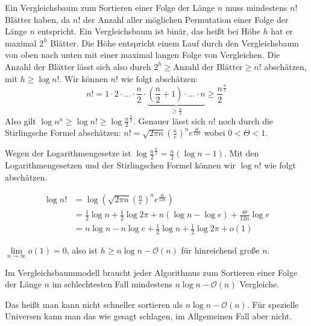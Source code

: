 Ein Vergleichsbaum zum Sortieren einer Folge der Länge $n$ muss mindestens $n!$ Blätter haben, da $n!$ der Anzahl aller möglichen Permutation einer Folge der Länge $n$ entspricht. Ein Vergleichsbaum ist binär, das heißt bei Höhe $h$ hat er maximal $2^h$ Blätter. Die Höhe entspricht einem Lauf durch den Vergleichsbaum von oben nach unten mit einer maximal langen Folge von Vergleichen. Die Anzahl der Blätter lässt sich also durch $2^h \ge \text{Anzahl der Blätter} \ge n!$ abschätzen, mit $h \ge \log n!$.
Wir können $n!$ wie folgt abschätzen:
\[n! = 1 \cdot 2 \cdot \ldots \cdot \frac{n}{2} \cdot \underbrace{\left(\frac{n}{2}+1\right) \cdot \ldots \cdot n}_{\ge \frac{n}{2}} \ge \frac{n}{2}^{\frac{n}{2}}\]
Also gilt $\log n^n \ge \log n! \ge \log \frac{n}{2}^{\frac{n}{2}}$. Genauer lässt sich $n!$ noch durch die Stirlingsche Formel abschätzen: $n! = \sqrt{2 \pi n} \left(\frac{n}{e}\right)^n e^{\frac{\Theta}{12n}}$ wobei $0<\Theta<1$.

Wegen der Logarithmengesetze  ist $\log \frac{n}{2}^{\frac{n}{2}} = \frac{n}{2} (\log n-1)$. Mit den Logarithmengesetzen und der Stirlingschen Formel können wir $\log n!$ wie folgt abschätzen.

\begin{align*}
\log n! &= \log \left(\sqrt{2 \pi n} \left(\frac{n}{e}\right)^n e^{\frac{\Theta}{12n}}\right) \\
          &= \frac{1}{2} \log n + \frac{1}{2} \log 2 \pi + n (\log n - \log e) + \frac{\Theta}{12n} \log e\\
          &= n \log n - n \log e + \frac{1}{2} \log n + \frac{1}{2} \log 2 \pi +  o(1)
\end{align*}

$\lim\limits_{n \rightarrow \infty}{o(1)} = 0$, also ist $h \ge n \log{n} - \mathcal{O}(n)$ für hinreichend große $n$.

\begin{Satz}
\hspace{\parindent}Im Vergleichsbaummodell braucht jeder Algorithmus zum Sortieren einer Folge der Länge $n$ im schlechtesten Fall mindestens $n \log{n} -\mathcal{O}(n)$ Vergleiche.
\end{Satz}

Das heißt man kann nicht schneller sortieren als $n \log{n} -\mathcal{O}(n)$. Für spezielle Universen kann man das wie gesagt schlagen, im Allgemeinen Fall aber nicht.


